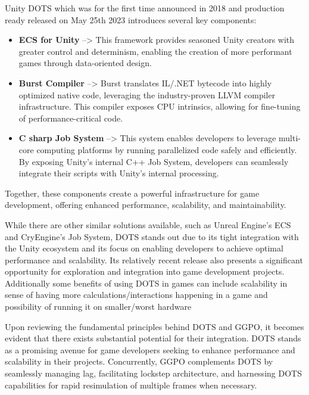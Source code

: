 Unity DOTS which was for the first time announced in 2018 and production ready released on May 25th 2023 introduces several key components:

\begin{itemize}
    \item \textbf{ECS for Unity} --> This framework provides seasoned Unity creators with greater control and determinism, enabling the creation of more performant games through data-oriented design.
    \item \textbf{Burst Compiler} --> Burst translates IL/.NET bytecode into highly optimized native code, leveraging the industry-proven LLVM compiler infrastructure. This compiler exposes CPU intrinsics, allowing for fine-tuning of performance-critical code.
    \item \textbf{C sharp Job System} --> This system enables developers to leverage multi-core computing platforms by running parallelized code safely and efficiently. By exposing Unity's internal C++ Job System, developers can seamlessly integrate their scripts with Unity's internal processing.
\end{itemize}

Together, these components create a powerful infrastructure for game development, offering enhanced performance, scalability, and maintainability.

While there are other similar solutions available, such as Unreal Engine's ECS and CryEngine's Job System, DOTS stands out due to its tight integration with the Unity ecosystem and its focus on enabling developers to achieve optimal performance and scalability. Its relatively recent release also presents a significant opportunity for exploration and integration into game development projects. Additionally some benefits of using DOTS in games can include scalability in sense of having more calculations/interactions happening in a game and possibility of running it on smaller/worst hardware\newline


Upon reviewing the fundamental principles behind DOTS and GGPO, it becomes evident that there exists substantial potential for their integration. DOTS stands as a promising avenue for game developers seeking to enhance performance and scalability in their projects. Concurrently, GGPO complements DOTS by seamlessly managing lag, facilitating lockstep architecture, and harnessing DOTS capabilities for rapid resimulation of multiple frames when necessary.

